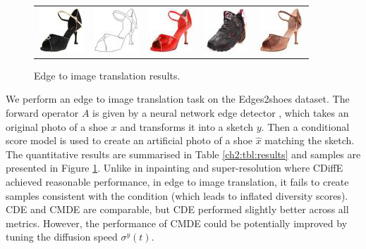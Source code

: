 \begin{figure}[ht]
\begin{center}
\begin{tabular}{ccccc}
        \includegraphics[width=.12\textwidth]{Chapter2/samples/edges-to-shoes/table/3/x.png} &   
        \includegraphics[width=.12\textwidth]{Chapter2/samples/edges-to-shoes/table/3/y.png} &
        \includegraphics[width=.12\textwidth]{Chapter2/samples/edges-to-shoes/table/3/sr3.png} & 
        \includegraphics[width=.12\textwidth]{Chapter2/samples/edges-to-shoes/table/3/Song.png} & 
        \includegraphics[width=.12\textwidth]{Chapter2/samples/edges-to-shoes/table/3/DV.png} \\
      \end{tabular}
    \end{center}
    \caption{Edge to image translation results.}
    \label{ch2:fig:edges-to-shoes}
  \end{figure}
  We perform an edge to image translation task on the Edges2shoes dataset. The forward operator $A$ is given by a neural network edge detector \cite{xie2015edges}, which takes an original photo of a shoe $x$ and transforms it into a sketch $y$. Then a conditional score model is used to create an artificial photo of a shoe $\hat{x}$ matching the sketch. The quantitative results are summarised in Table \ref{ch2:tbl:results} and samples are presented in Figure \ref{ch2:fig:edges-to-shoes}. Unlike in inpainting and super-resolution where CDiffE achieved reasonable performance, in edge to image translation, it fails to create samples consistent with the condition (which leads to inflated diversity scores). CDE and CMDE are comparable, but CDE performed slightly better across all metrics. However, the performance of CMDE could be potentially improved by  tuning the diffusion speed $\sigma^y(t)$.
  


